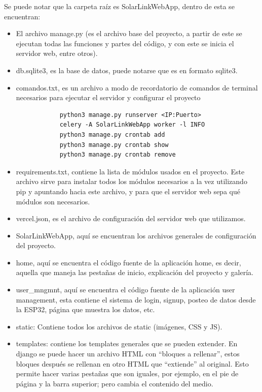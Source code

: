 Se puede notar que la carpeta raíz es SolarLinkWebApp, dentro de esta se encuentran: \\

\begin{itemize}
    \item El archivo manage.py (es el archivo base del proyecto, a partir de este se ejecutan todas las funciones y partes del código, y con este se inicia el servidor web, entre otros).
    \item db.sqlite3, es la base de datos, puede notarse que es en formato sqlite3.
    \item comandos.txt, es un archivo a modo de recordatorio de comandos de terminal necesarios para ejecutar el servidor y configurar el proyecto\\

\begin{listing}[H]
\begin{verbatim}
            python3 manage.py runserver <IP:Puerto>
            celery -A SolarLinkWebApp worker -l INFO
            python3 manage.py crontab add 
            python3 manage.py crontab show
            python3 manage.py crontab remove
\end{verbatim}
\label{listing:comandos en terminal}
\end{listing}


    \item requirements.txt, contiene la lista de módulos usados en el proyecto. Este archivo sirve para instalar todos los módulos necesarios a la vez utilizando pip y apuntando hacia este archivo, y para que el servidor web sepa qué módulos son necesarios.

    \item vercel.json, es el archivo de configuración del servidor web que utilizamos.
    \item SolarLinkWebApp, aquí se encuentran los archivos generales de configuración del proyecto.
    \item home, aquí se encuentra el código fuente de la aplicación home, es decir, aquella que maneja las pestañas de inicio, explicación del proyecto y galería.
    \item user\_mngmnt, aquí se encuentra el código fuente de la aplicación user management, esta contiene el sistema de login, signup, posteo de datos desde la ESP32, página que muestra los datos, etc.
    \item static: Contiene todos los archivos de static (imágenes, CSS y JS).
    \item templates: contiene los templates generales que se pueden extender. En django se puede hacer un archivo HTML con “bloques a rellenar”, estos bloques después se rellenan en otro HTML que “extiende” al original. Esto permite hacer varias pestañas que son iguales, por ejemplo, en el pie de página y la barra superior; pero cambia el contenido del medio.

\end{itemize}


